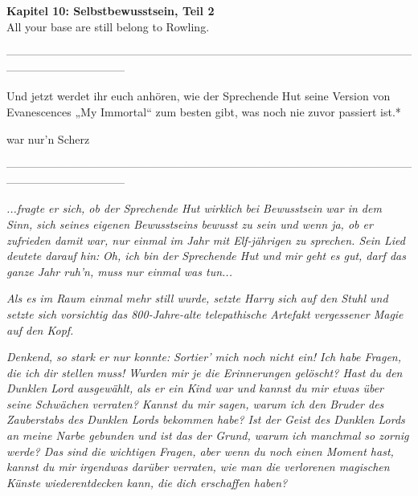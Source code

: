 

\hypertarget{selbstbewusstsein-teil-2}{%

\textbf{Kapitel 10: Selbstbewusstsein, Teil 2}\\

\hfill\break All your base are still belong to Rowling.

--------------------------------------------------------------------------------------------------------------------------------------------

\hfill\break Und jetzt werdet ihr euch anhören, wie der Sprechende Hut seine Version von Evanescences „My Immortal“ zum besten gibt, was noch nie zuvor passiert ist.*

war nur'n Scherz

--------------------------------------------------------------------------------------------------------------------------------------------

\hfill\break \emph{...fragte er sich, ob der Sprechende Hut wirklich} \emph{\emph{bei Bewusstsein}} \emph{war in dem Sinn, sich seines eigenen Bewusstseins bewusst zu sein und wenn ja, ob er zufrieden damit war, nur einmal im Jahr mit Elf-jährigen zu sprechen. Sein Lied deutete darauf hin:} \emph{\emph{Oh, ich bin der Sprechende Hut und mir geht es gut, darf das ganze Jahr ruh'n, muss nur einmal was tun...}}

\emph{Als es im Raum einmal mehr still wurde, setzte Harry sich auf den Stuhl und setzte sich} \emph{\emph{vorsichtig}} \emph{das 800-Jahre-alte telepathische Artefakt vergessener Magie auf den Kopf.}

\emph{Denkend, so stark er nur konnte:} \emph{\emph{Sortier' mich noch nicht ein! Ich habe Fragen, die ich dir stellen muss! Wurden mir je die Erinnerungen gelöscht? Hast du den Dunklen Lord ausgewählt, als er ein Kind war und kannst du mir etwas über seine Schwächen verraten? Kannst du mir sagen, warum ich den Bruder des Zauberstabs des Dunklen Lords bekommen habe? Ist der Geist des Dunklen Lords an meine Narbe gebunden und ist das der Grund, warum ich manchmal so zornig werde? Das sind die wichtigen Fragen, aber wenn du noch einen Moment hast, kannst du mir irgendwas darüber verraten, wie man die verlorenen magischen Künste wiederentdecken kann, die dich erschaffen haben?}}

}
